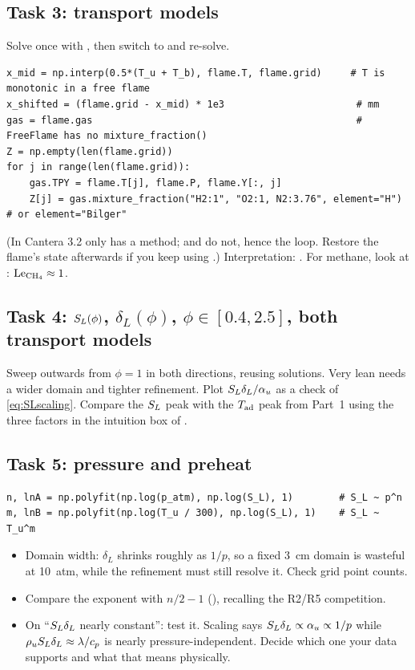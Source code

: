 \subsection*{Task 3: transport models}
Solve once with , then switch to  and re-solve.
\begin{lstlisting}
x_mid = np.interp(0.5*(T_u + T_b), flame.T, flame.grid)     # T is monotonic in a free flame
x_shifted = (flame.grid - x_mid) * 1e3                       # mm
gas = flame.gas                                              # FreeFlame has no mixture_fraction()
Z = np.empty(len(flame.grid))
for j in range(len(flame.grid)):
    gas.TPY = flame.T[j], flame.P, flame.Y[:, j]
    Z[j] = gas.mixture_fraction("H2:1", "O2:1, N2:3.76", element="H")   # or element="Bilger"
\end{lstlisting}
(In Cantera 3.2 only  has a  method;
 and  do not, hence the loop. Restore the flame's state afterwards if you
keep using .)
Interpretation: . For methane, look at : $\mathrm{Le}_{\mathrm{CH_4}}\approx1$.

\subsection*{Task 4: $S_L(\phi)$, $\delta_L(\phi)$, $\phi\in[0.4,2.5]$, both transport models}
Sweep outwards from $\phi=1$ in both directions, reusing solutions. Very lean  needs a wider domain and
tighter refinement. Plot $S_L\delta_L/\alpha_u$ as a check of \eqref{eq:SLscaling}. Compare the $S_L$ peak with
the $T_{\mathrm{ad}}$ peak from Part~1 using the three factors in the intuition box of .

\subsection*{Task 5: pressure and preheat}
\begin{lstlisting}
n, lnA = np.polyfit(np.log(p_atm), np.log(S_L), 1)        # S_L ~ p^n
m, lnB = np.polyfit(np.log(T_u / 300), np.log(S_L), 1)    # S_L ~ T_u^m
\end{lstlisting}
\begin{itemize}
  \item Domain width: $\delta_L$ shrinks roughly as $1/p$, so a fixed \SI{3}{\centi\metre} domain is wasteful at
        10~atm, while the refinement must still resolve it. Check grid point counts.
  \item Compare the exponent with $n/2-1$ (), recalling the R2/R5 competition.
  \item On ``$S_L\delta_L$ nearly constant'': test it. Scaling says $S_L\delta_L\propto\alpha_u\propto1/p$ while
        $\rho_uS_L\delta_L\approx\lambda/c_p$ is nearly pressure-independent. Decide which one your data supports
        and what that means physically.
\end{itemize}

